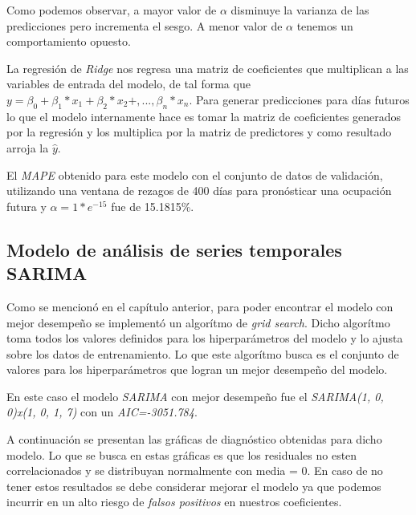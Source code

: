 Como podemos observar, a mayor valor de $\alpha$ disminuye la varianza de las predicciones pero incrementa el sesgo. A menor valor de $\alpha$ tenemos un comportamiento opuesto.

La regresión de \emph{Ridge} nos regresa una matriz de coeficientes que multiplican a las variables de entrada del modelo, de tal forma que $y=\beta_0 + \beta_1*x_1 + \beta_2*x_2 + ,..., \beta_n*x_n$. Para generar predicciones para días futuros lo que el modelo internamente hace es tomar la matriz de coeficientes generados por la regresión y los multiplica por la matriz de predictores y como resultado arroja la $\hat{y}$.

El \emph{MAPE} obtenido para este modelo con el conjunto de datos de validación, utilizando una ventana de rezagos de 400 días  para pronósticar una ocupación futura y $\alpha = 1*e^{-15}$ fue de 15.1815\%.

\subsection*{Modelo de análisis de series temporales SARIMA}

Como se mencionó en el capítulo anterior, para poder encontrar el modelo con mejor desempeño se implementó un algorítmo de \emph{grid search}. Dicho algorítmo toma todos los valores definidos para los hiperparámetros del modelo y lo ajusta sobre los datos de entrenamiento. Lo que este algorítmo busca es el conjunto de valores para los hiperparámetros que logran un mejor desempeño del modelo.

En este caso el modelo \emph{SARIMA} con mejor desempeño fue el \emph{SARIMA(1, 0, 0)x(1, 0, 1, 7)} con un \emph{AIC=-3051.784}.

A continuación se presentan las gráficas de diagnóstico obtenidas para dicho modelo. Lo que se busca en estas gráficas es que los residuales no esten correlacionados y se distribuyan normalmente con media = 0. En caso de no tener estos resultados se debe considerar mejorar el modelo ya que podemos incurrir en un alto riesgo de \emph{falsos positivos} en nuestros coeficientes.

